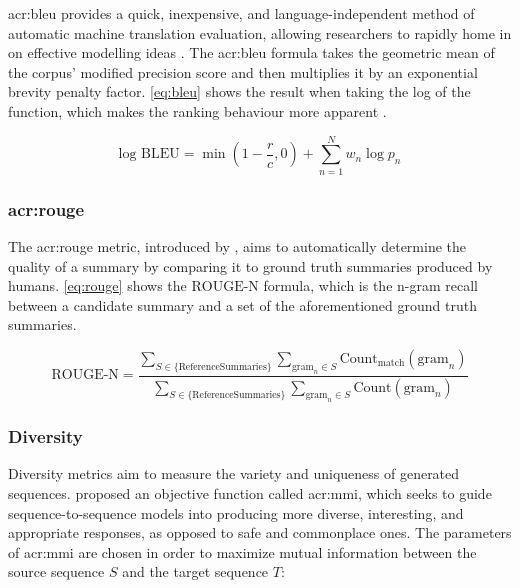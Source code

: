 \gls{acr:bleu} provides a quick, inexpensive, and language-independent method of automatic machine translation evaluation, allowing researchers to rapidly home in on effective modelling ideas \citep{papineniBleuMethodAutomatic2002}. The \gls{acr:bleu} formula takes the geometric mean of the corpus' modified precision score and then multiplies it by an exponential brevity penalty factor. \eqref{eq:bleu} shows the result when taking the log of the function, which makes the ranking behaviour more apparent \citep[5]{papineniBleuMethodAutomatic2002}.

\begin{equation}
    \text{log BLEU} = \min\left(1 - \frac{r}{c}, 0\right) + \sum_{n=1}^{N} w_n \log p_n
    \label{eq:bleu}
\end{equation}

\subsubsection[Recall-Oriented Understudy for Gisting Evaluation (ROUGE)]{\acrfull{acr:rouge}}

The \gls{acr:rouge} metric, introduced by \cite{linROUGEPackageAutomatic2004}, aims to automatically determine the quality of a summary by comparing it to ground truth summaries produced by humans. \eqref{eq:rouge} shows the $\text{ROUGE-N}$ formula, which is the n-gram recall between a candidate summary and a set of the aforementioned ground truth summaries.

\begin{equation}
    \text{ROUGE-N} = \frac{
    \sum_{S \in \{\text{ReferenceSummaries}\}}
    \sum_{\text{gram}_n \in S}
    \text{Count}_{\text{match}}(\text{gram}_n)
    }{
    \sum_{S \in \{\text{ReferenceSummaries}\}}
    \sum_{\text{gram}_n \in S}
    \text{Count}(\text{gram}_n)
    }
    \label{eq:rouge}
\end{equation}

\subsubsection{Diversity}

Diversity metrics aim to measure the variety and uniqueness of generated sequences. \cite{liDiversityPromotingObjectiveFunction2016} proposed an objective function called \gls{acr:mmi}, which seeks to guide sequence-to-sequence models into producing more diverse, interesting, and appropriate responses, as opposed to safe and commonplace ones. The parameters of \gls{acr:mmi} are chosen in order to maximize mutual information between the source sequence $S$ and the target sequence $T$:

